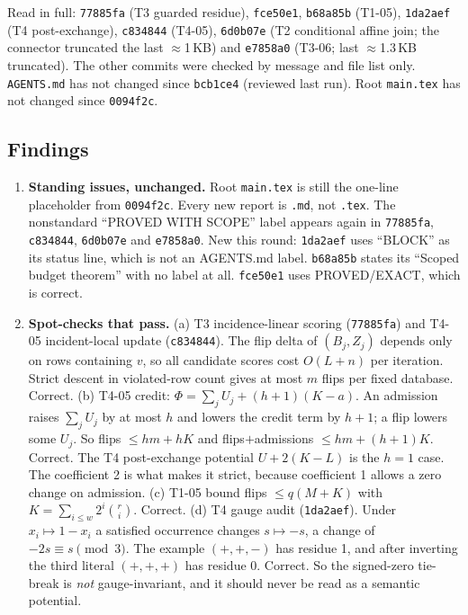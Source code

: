 \documentclass[11pt]{article}
\theoremstyle{definition}
\begin{document}
Read in full: \texttt{77885fa} (T3 guarded residue), \texttt{fce50e1}, \texttt{b68a85b} (T1-05), \texttt{1da2aef} (T4 post-exchange), \texttt{c834844} (T4-05), \texttt{6d0b07e} (T2 conditional affine join; the connector truncated the last $\approx$1\,KB) and \texttt{e7858a0} (T3-06; last $\approx$1.3\,KB truncated). The other commits were checked by message and file list only. \texttt{AGENTS.md} has not changed since \texttt{bcb1ce4} (reviewed last run). Root \texttt{main.tex} has not changed since \texttt{0094f2c}.

\subsection*{Findings}
\begin{enumerate}
\item \textbf{Standing issues, unchanged.} Root \texttt{main.tex} is still the one-line placeholder from \texttt{0094f2c}. Every new report is \texttt{.md}, not \texttt{.tex}. The nonstandard ``PROVED WITH SCOPE'' label appears again in \texttt{77885fa}, \texttt{c834844}, \texttt{6d0b07e} and \texttt{e7858a0}. New this round: \texttt{1da2aef} uses ``BLOCK'' as its status line, which is not an AGENTS.md label. \texttt{b68a85b} states its ``Scoped budget theorem'' with no label at all. \texttt{fce50e1} uses PROVED/EXACT, which is correct.
\item \textbf{Spot-checks that pass.}
 (a) T3 incidence-linear scoring (\texttt{77885fa}) and T4-05 incident-local update (\texttt{c834844}). The flip delta of $(B_j,Z_j)$ depends only on rows containing $v$, so all candidate scores cost $O(L+n)$ per iteration. Strict descent in violated-row count gives at most $m$ flips per fixed database. Correct.
 (b) T4-05 credit: $\Phi=\sum_j U_j+(h+1)(K-a)$. An admission raises $\sum_j U_j$ by at most $h$ and lowers the credit term by $h+1$; a flip lowers some $U_j$. So flips $\le hm+hK$ and flips$+$admissions $\le hm+(h+1)K$. Correct. The T4 post-exchange potential $U+2(K-L)$ is the $h=1$ case. The coefficient 2 is what makes it strict, because coefficient 1 allows a zero change on admission.
 (c) T1-05 bound flips $\le q(M+K)$ with $K=\sum_{i\le w}2^i\binom{r}{i}$. Correct.
 (d) T4 gauge audit (\texttt{1da2aef}). Under $x_i\mapsto 1-x_i$ a satisfied occurrence changes $s\mapsto -s$, a change of $-2s\equiv s \pmod 3$. The example $(+,+,-)$ has residue 1, and after inverting the third literal $(+,+,+)$ has residue 0. Correct. So the signed-zero tie-break is \emph{not} gauge-invariant, and it should never be read as a semantic potential.

\end{enumerate}
\end{document}
